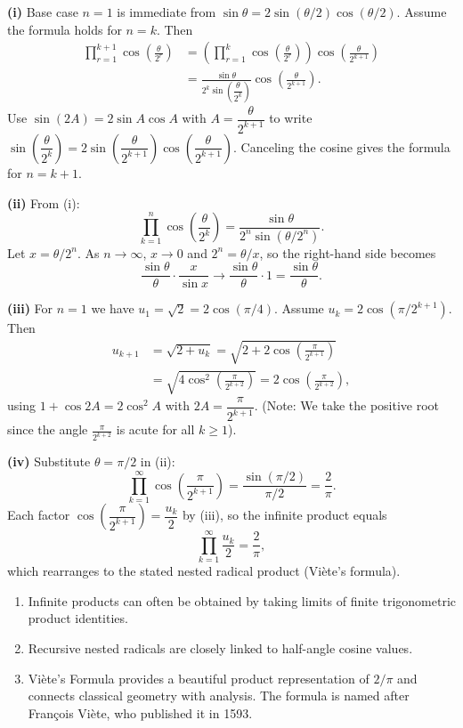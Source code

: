 \begin{solution}
\textbf{(i)} Base case $n=1$ is immediate from $\sin\theta = 2\sin(\theta/2)\cos(\theta/2)$. Assume the formula holds for $n=k$. Then
\begin{align*}
  \prod_{r=1}^{k+1}\cos\left(\frac{\theta}{2^r}\right)
  &= \left(\prod_{r=1}^{k}\cos\left(\frac{\theta}{2^r}\right)\right)\cos\left(\frac{\theta}{2^{k+1}}\right) \\
  &= \frac{\sin\theta}{2^k\sin\left(\dfrac{\theta}{2^k}\right)}\cos\left(\frac{\theta}{2^{k+1}}\right).
\end{align*}
Use $\sin(2A)=2\sin A\cos A$ with $A=\dfrac{\theta}{2^{k+1}}$ to write
\(\sin\left(\dfrac{\theta}{2^k}\right)=2\sin\left(\dfrac{\theta}{2^{k+1}}\right)\cos\left(\dfrac{\theta}{2^{k+1}}\right)\).
Canceling the cosine gives the formula for $n=k+1$.

\textbf{(ii)} From (i):
\[\prod_{k=1}^{n} \cos\left(\frac{\theta}{2^k}\right)=\frac{\sin\theta}{2^n\sin(\theta/2^n)}.
\]
Let $x=\theta/2^n$. As $n\to\infty$, $x\to0$ and $2^n = \theta/x$, so the right-hand side becomes
\[\frac{\sin\theta}{\theta}\cdot\frac{x}{\sin x} \to \frac{\sin\theta}{\theta} \cdot 1 = \frac{\sin\theta}{\theta}.
\]

\textbf{(iii)} For $n=1$ we have $u_1=\sqrt2=2\cos(\pi/4)$. Assume $u_k=2\cos(\pi/2^{k+1})$. Then
\begin{align*}
  u_{k+1} &= \sqrt{2+u_k} = \sqrt{2 + 2\cos\left(\frac{\pi}{2^{k+1}}\right)} \\
  &= \sqrt{4\cos^2\left(\frac{\pi}{2^{k+2}}\right)} = 2\cos\left(\frac{\pi}{2^{k+2}}\right),
\end{align*}
using $1+\cos 2A = 2\cos^2 A$ with $2A=\dfrac{\pi}{2^{k+1}}$. (Note: We take the positive root since the angle $\frac{\pi}{2^{k+2}}$ is acute for all $k \ge 1$).

\textbf{(iv)} Substitute $\theta=\pi/2$ in (ii):
\[\prod_{k=1}^{\infty} \cos\left(\frac{\pi}{2^{k+1}}\right)=\frac{\sin(\pi/2)}{\pi/2}=\frac{2}{\pi}.
\]
Each factor $\cos\left(\dfrac{\pi}{2^{k+1}}\right)=\dfrac{u_k}{2}$ by (iii), so the infinite product equals
\[\prod_{k=1}^{\infty} \frac{u_k}{2} = \frac{2}{\pi},
\]
which rearranges to the stated nested radical product (Viète's formula).

\end{solution}

\begin{takeaways}
\begin{enumerate}
  \item Infinite products can often be obtained by taking limits of finite trigonometric product identities.
  \item Recursive nested radicals are closely linked to half-angle cosine values.
  \item Viète's Formula provides a beautiful product representation of $2/\pi$ and connects classical geometry with analysis. 
  The formula is named after François Viète, who published it in 1593.
\end{enumerate}
\end{takeaways}

